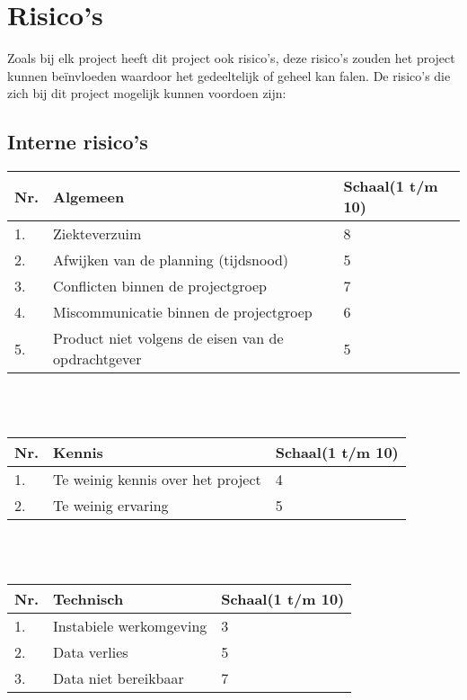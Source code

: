\chapter{Risico's} \label{cha:risicos}

Zoals bij elk project heeft dit project ook risico’s, deze risico’s zouden het project kunnen beïnvloeden waardoor het gedeeltelijk of geheel kan falen. De risico’s die zich bij dit project mogelijk kunnen voordoen zijn:

\section{Interne risico's} \label{sec:Interne risicos}


    \begin{tabular}{ | l | l | l | }
    	\hline
    	Nr. & Algemeen & Schaal(1 t/m 10) \\ \hline
    	1.	& Ziekteverzuim & 8 \\ \hline
    	2.  & Afwijken van de planning (tijdsnood) & 5 \\ \hline
    	3.  & Conflicten binnen de projectgroep & 7 \\ \hline
    	4.  & Miscommunicatie binnen de projectgroep & 6 \\ \hline
    	5.  & Product niet volgens de eisen van de opdrachtgever & 5 \\ \hline
  	\end{tabular}
\\
\\
    \begin{tabular}{ | l | l | l | }
    	\hline
    	Nr. & Kennis & Schaal(1 t/m 10) \\ \hline
    	1.	& Te weinig kennis over het project & 4 \\ \hline
    	2.  & Te weinig ervaring & 5 \\ \hline
  	\end{tabular}
\\
\\
    \begin{tabular}{ | l | l | l | }
    	\hline
    	Nr. & Technisch & Schaal(1 t/m 10) \\ \hline
    	1.	& Instabiele werkomgeving & 3 \\ \hline
    	2.  & Data verlies & 5 \\ \hline
    	3.  & Data niet bereikbaar & 7 \\ \hline
  	\end{tabular}

